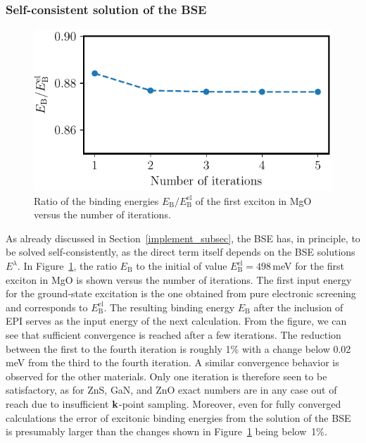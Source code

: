 \subsubsection{Self-consistent solution of the BSE}\label{subsec_selfconsistent}
%
\begin{figure}[t]
\captionsetup{format=plain}
\centering
\includegraphics{work/plots/mgo_iteration.pdf}
\caption{Ratio of the binding energies $E_\text{B}^{\phantom{l}}/E^\text{el}_\text{B}$  of the first exciton in MgO versus the number of iterations.\label{iteration_conv}}
\end{figure}
%
As already discussed in Section~\ref{implement_subsec}, the BSE has, in principle, to be solved self-consistently, as the direct term itself depends on the BSE solutions $E^\lambda$.  In Figure~\ref{iteration_conv}, the ratio $E_\text{B}^{\phantom{l}}$ to the initial of value $E^\text{el}_\text{B} = 498$\,meV for the first exciton in MgO is shown versus the number of iterations. The first input energy for the ground-state excitation is the one obtained from pure electronic screening and corresponds to $E^\text{el}_\text{B}$. The resulting binding energy $E_\text{B}^{\phantom{l}}$ after the inclusion of EPI serves as the input energy of the next calculation. From the figure, we can see that sufficient convergence is reached after a few iterations. The reduction between the first to the fourth iteration is roughly 1\% with a change below 0.02\,meV from the third to the fourth iteration. A similar convergence behavior is observed for the other materials. Only one iteration is therefore seen to be satisfactory, as for ZnS, GaN, and ZnO exact numbers are in any case out of reach due to insufficient $\mathbf{k}$-point sampling. Moreover, even for fully converged calculations the error of excitonic binding energies from the solution of the BSE is presumably larger than the changes shown in Figure~\ref{iteration_conv} being  below~1\%.  

